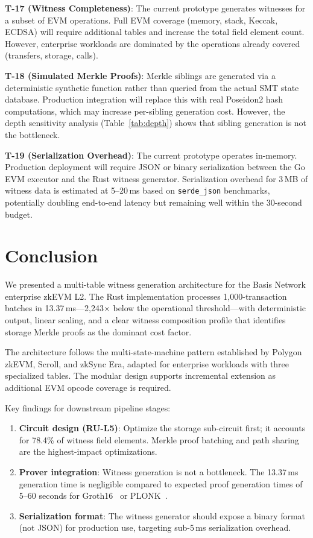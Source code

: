 \documentclass[conference]{IEEEtran}
\begin{document}
\textbf{T-17 (Witness Completeness)}: The current prototype generates
witnesses for a subset of EVM operations. Full EVM coverage (memory,
stack, Keccak, ECDSA) will require additional tables and increase the
total field element count. However, enterprise workloads are dominated
by the operations already covered (transfers, storage, calls).

\textbf{T-18 (Simulated Merkle Proofs)}: Merkle siblings are generated
via a deterministic synthetic function rather than queried from the
actual SMT state database. Production integration will replace this
with real Poseidon2 hash computations, which may increase per-sibling
generation cost. However, the depth sensitivity analysis
(Table~\ref{tab:depth}) shows that sibling generation is not the
bottleneck.

\textbf{T-19 (Serialization Overhead)}: The current prototype operates
in-memory. Production deployment will require JSON or binary
serialization between the Go EVM executor and the Rust witness
generator. Serialization overhead for 3\,MB of witness data is
estimated at 5--20\,ms based on \texttt{serde\_json} benchmarks,
potentially doubling end-to-end latency but remaining well within
the 30-second budget.

\section{Conclusion}
\label{sec:conclusion}

We presented a multi-table witness generation architecture for the
Basis Network enterprise zkEVM L2. The Rust implementation processes
1{,}000-transaction batches in 13.37\,ms---2{,}243$\times$ below the
operational threshold---with deterministic output, linear scaling,
and a clear witness composition profile that identifies storage Merkle
proofs as the dominant cost factor.

The architecture follows the multi-state-machine pattern established
by Polygon zkEVM, Scroll, and zkSync Era, adapted for enterprise
workloads with three specialized tables. The modular design supports
incremental extension as additional EVM opcode coverage is required.

Key findings for downstream pipeline stages:

\begin{enumerate}
\item \textbf{Circuit design (RU-L5)}: Optimize the storage sub-circuit
      first; it accounts for 78.4\% of witness field elements. Merkle
      proof batching and path sharing are the highest-impact
      optimizations.
\item \textbf{Prover integration}: Witness generation is not a
      bottleneck. The 13.37\,ms generation time is negligible compared
      to expected proof generation times of 5--60 seconds for
      Groth16~\cite{groth16} or PLONK~\cite{plonk-2019}.
\item \textbf{Serialization format}: The witness generator should
      expose a binary format (not JSON) for production use, targeting
      sub-5\,ms serialization overhead.
\end{enumerate}
\end{document}
